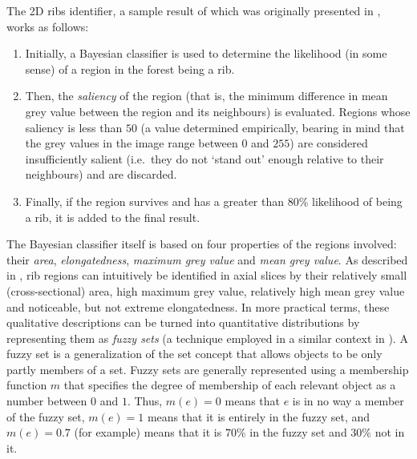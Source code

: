 The 2D ribs identifier, a sample result of which was originally presented in \cite{gvccimi08}, works as follows:

\begin{enumerate}

\item Initially, a Bayesian classifier is used to determine the likelihood (in some sense) of a region in the forest being a rib.
\item Then, the \emph{saliency} of the region (that is, the minimum difference in mean grey value between the region and its neighbours) is evaluated. Regions whose saliency is less than $50$ (a value determined empirically, bearing in mind that the grey values in the image range between $0$ and $255$) are considered insufficiently salient (i.e.~they do not `stand out' enough relative to their neighbours) and are discarded.
\item Finally, if the region survives and has a greater than $80\%$ likelihood of being a rib, it is added to the final result.

\end{enumerate}

\noindent The Bayesian classifier itself is based on four properties of the regions involved: their \emph{area}, \emph{elongatedness}, \emph{maximum grey value} and \emph{mean grey value}. As described in \cite{gvccimi08}, rib regions can intuitively be identified in axial slices by their relatively small (cross-sectional) area, high maximum grey value, relatively high mean grey value and noticeable, but not extreme elongatedness. In more practical terms, these qualitative descriptions can be turned into quantitative distributions by representing them as \emph{fuzzy sets} (a technique employed in a similar context in \cite{lee03}). A fuzzy set is a generalization of the set concept that allows objects to be only partly members of a set. Fuzzy sets are generally represented using a membership function $m$ that specifies the degree of membership of each relevant object as a number between $0$ and $1$. Thus, $m(e) = 0$ means that $e$ is in no way a member of the fuzzy set, $m(e) = 1$ means that it is entirely in the fuzzy set, and $m(e) = 0.7$ (for example) means that it is $70\%$ in the fuzzy set and $30\%$ not in it.

